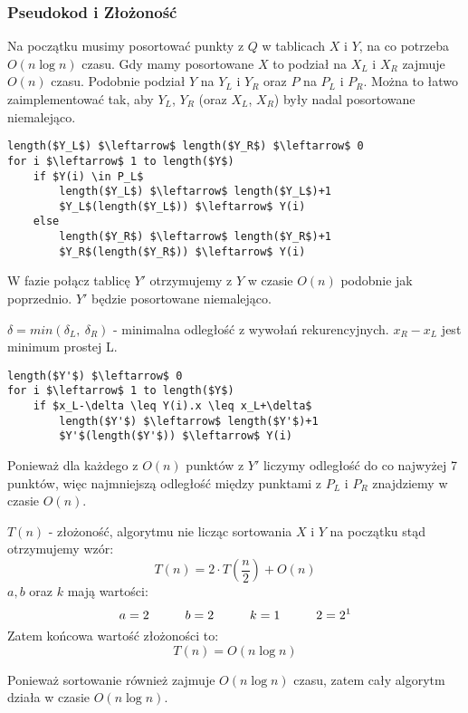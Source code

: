 \subsubsection{Pseudokod i Złożoność}
Na początku musimy posortować punkty z $Q$ w tablicach $X$ i $Y$, na co potrzeba $O(n \log n)$ czasu. Gdy mamy posortowane $X$ to podział na $X_L$ i $X_R$ zajmuje $O(n)$ czasu. Podobnie podział $Y$ na $Y_L$ i $Y_R$ oraz $P$ na $P_L$ i $P_R$. Można to łatwo zaimplementować tak, aby $Y_L$, $Y_R$ (oraz $X_L$, $X_R$) były nadal posortowane niemalejąco.

\begin{lstlisting}
length($Y_L$) $\leftarrow$ length($Y_R$) $\leftarrow$ 0
for i $\leftarrow$ 1 to length($Y$)
	if $Y(i) \in P_L$ 
    	length($Y_L$) $\leftarrow$ length($Y_L$)+1
    	$Y_L$(length($Y_L$)) $\leftarrow$ Y(i)
	else
    	length($Y_R$) $\leftarrow$ length($Y_R$)+1
    	$Y_R$(length($Y_R$)) $\leftarrow$ Y(i)
\end{lstlisting}

W fazie połącz tablicę $Y'$ otrzymujemy z $Y$ w czasie $O(n)$ podobnie jak poprzednio. $Y'$ będzie posortowane niemalejąco. 

$\delta = min(\delta_L,\ \delta_R)$ - minimalna odległość z wywołań rekurencyjnych. $x_R-x_L$ jest minimum prostej L.

\begin{lstlisting}
length($Y'$) $\leftarrow$ 0
for i $\leftarrow$ 1 to length($Y$)
	if $x_L-\delta \leq Y(i).x \leq x_L+\delta$ 
    	length($Y'$) $\leftarrow$ length($Y'$)+1
    	$Y'$(length($Y'$)) $\leftarrow$ Y(i)
\end{lstlisting}

Ponieważ dla każdego z $O(n)$ punktów z $Y'$ liczymy odległość do co najwyżej 7 punktów, więc najmniejszą odległość między punktami z $P_L$ i $P_R$ znajdziemy w czasie $O(n)$.

$T(n)$ - złożoność, algorytmu nie licząc sortowania $X$ i $Y$ na początku stąd otrzymujemy wzór:
$$T(n) = 2 \cdot T(\frac{n}{2})+O(n)$$
$a,b$ oraz $k$ mają wartości:
$$a=2 \hspace*{1cm} b=2 \hspace*{1cm} k=1 \hspace*{1cm} 2=2^1$$
Zatem końcowa wartość złożoności to:
$$T(n) = O(n \log n)$$

Ponieważ sortowanie również zajmuje $O(n \log n)$ czasu, zatem cały algorytm działa w czasie $O(n \log n)$.